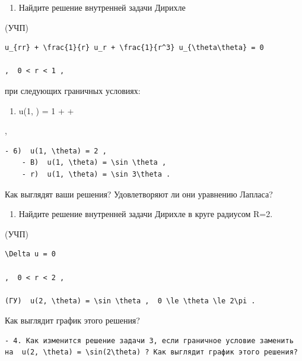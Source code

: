 \documentclass[
  ukrainian,
]{article}
\providecommand{\tightlist}{%
  \setlength{\itemsep}{0pt}\setlength{\parskip}{0pt}}
\begin{document}
\begin{enumerate}
\def\labelenumi{\arabic{enumi}.}
\setcounter{enumi}{1}
\tightlist
\item
  Найдите решение внутренней задачи Дирихле
\end{enumerate}

(УЧП)

\begin{verbatim}
u_{rr} + \frac{1}{r} u_r + \frac{1}{r^3} u_{\theta\theta} = 0

,  0 < r < 1 ,
\end{verbatim}

при следующих граничных условиях:

\begin{enumerate}
\def\labelenumi{\alph{enumi})}
\tightlist
\item
  u(1, \theta) = 1 + \sin \theta +  \cos \theta
\end{enumerate}

,

\begin{verbatim}
- 6)  u(1, \theta) = 2 ,
    - B)  u(1, \theta) = \sin \theta ,
    - r)  u(1, \theta) = \sin 3\theta .
\end{verbatim}

Как выглядят ваши решения? Удовлетворяют ли они уравнению Лапласа?

\begin{enumerate}
\def\labelenumi{\arabic{enumi}.}
\setcounter{enumi}{2}
\tightlist
\item
  Найдите решение внутренней задачи Дирихле в круге радиусом R=2.
\end{enumerate}

(УЧП)

\begin{verbatim}
\Delta u = 0

,  0 < r < 2 ,

(ГУ)  u(2, \theta) = \sin \theta ,  0 \le \theta \le 2\pi .
\end{verbatim}

Как выглядит график этого решения?

\begin{verbatim}
- 4. Как изменится решение задачи 3, если граничное условие заменить на  u(2, \theta) = \sin(2\theta) ? Как выглядит график этого решения?
\end{verbatim}
\end{document}
